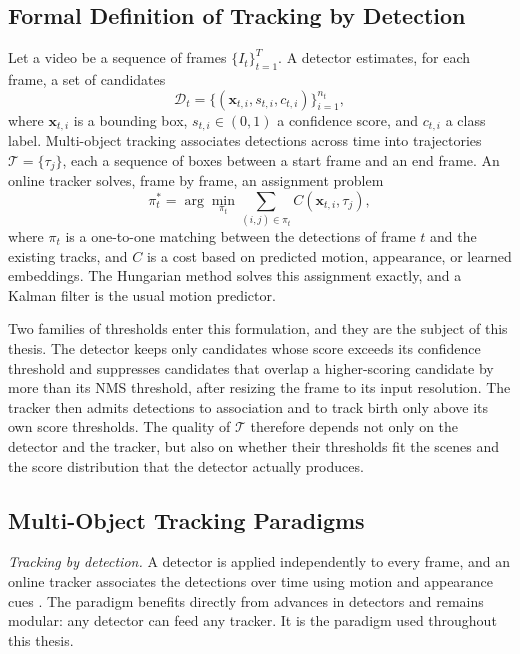 \subsection{Formal Definition of Tracking by Detection}\label{sec:bg-problem}
Let a video be a sequence of frames $\{I_t\}_{t=1}^{T}$. A detector estimates, for each frame, a set of candidates
\begin{equation}
\mathcal{D}_t = \{(\mathbf{x}_{t,i}, s_{t,i}, c_{t,i})\}_{i=1}^{n_t},
\label{eq:bg-dets}
\end{equation}
where $\mathbf{x}_{t,i}$ is a bounding box, $s_{t,i}\in(0,1)$ a confidence score, and $c_{t,i}$ a class label. Multi-object tracking associates detections across time into trajectories $\mathcal{T}=\{\tau_j\}$, each a sequence of boxes between a start frame and an end frame. An online tracker solves, frame by frame, an assignment problem
\begin{equation}
\pi_t^{*} = \arg\min_{\pi_t} \sum_{(i,j)\in\pi_t} C\left(\mathbf{x}_{t,i}, \tau_j\right),
\label{eq:bg-assign}
\end{equation}
where $\pi_t$ is a one-to-one matching between the detections of frame $t$ and the existing tracks, and $C$ is a cost based on predicted motion, appearance, or learned embeddings. The Hungarian method \cite{kuhn1955hungarian} solves this assignment exactly, and a Kalman filter \cite{kalman1960} is the usual motion predictor.

Two families of thresholds enter this formulation, and they are the subject of this thesis. The detector keeps only candidates whose score exceeds its confidence threshold and suppresses candidates that overlap a higher-scoring candidate by more than its NMS threshold, after resizing the frame to its input resolution. The tracker then admits detections to association and to track birth only above its own score thresholds. The quality of $\mathcal{T}$ therefore depends not only on the detector and the tracker, but also on whether their thresholds fit the scenes and the score distribution that the detector actually produces.

\subsection{Multi-Object Tracking Paradigms}\label{sec:bg-paradigms}
\emph{Tracking by detection.} A detector is applied independently to every frame, and an online tracker associates the detections over time using motion and appearance cues \cite{bewley2016sort,wojke2017deepsort}. The paradigm benefits directly from advances in detectors and remains modular: any detector can feed any tracker. It is the paradigm used throughout this thesis.

